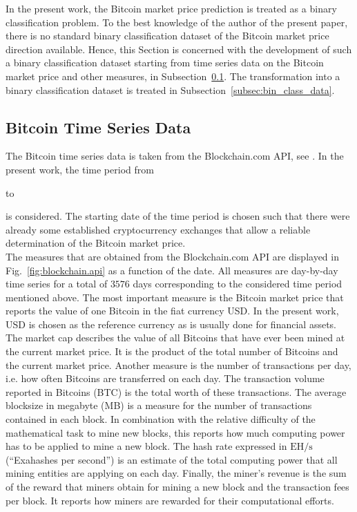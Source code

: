 In the present work, the Bitcoin market price prediction is treated as a binary classification problem. To the best knowledge of the author of the present paper, there is no standard binary classification dataset of the Bitcoin market price direction available. Hence, this Section is concerned with the development of such a binary classification dataset starting from time series data on the Bitcoin  market price and other measures, in Subsection~\ref{subsec:time_series_data}. The transformation into a binary classification dataset is treated in Subsection~\ref{subsec:bin_class_data}.

\subsection{Bitcoin Time Series Data}\label{subsec:time_series_data}

The Bitcoin time series data is taken from the Blockchain.com API, see  \cite{Data}. In the present work, the time period from \date{01 September 2011} to \date{15 June 2021} is considered. The starting date of the time period is chosen such that there were already some established cryptocurrency exchanges that allow a reliable determination of the Bitcoin market price.\\

The measures that are obtained from the Blockchain.com API are displayed in Fig.~\ref{fig:blockchain.api} as a function of the date. All measures are day-by-day time series for a total of $3576$ days corresponding to the considered time period mentioned above. The most important measure is the Bitcoin market price that reports the value of one Bitcoin in the fiat currency USD. In the present work, USD is chosen as the reference currency as is usually done for financial assets. The market cap describes the value of all Bitcoins that have ever been mined at the current market price. It is the product of the total number of Bitcoins and the current market price. Another measure is the number of transactions per day, i.e. how often Bitcoins are transferred on each day. The transaction volume reported in Bitcoins (BTC) is the total worth of these transactions. The average blocksize in megabyte (MB) is a measure for the number of transactions contained in each block. In combination with the relative difficulty of the mathematical task to mine new blocks, this reports how much computing power has to be applied to mine a new block. The hash rate expressed in $\mathrm{EH} / \mathrm{s}$ (\enquote{Exahashes per second}) is an estimate of the total computing power that all mining entities are applying on each day. Finally, the miner's revenue is the sum of the reward that miners obtain for mining a new block and the transaction fees per block. It reports how miners are rewarded for their computational efforts.\\

